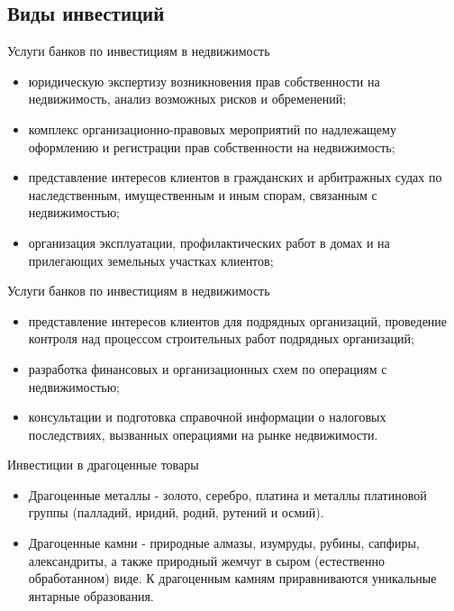 \documentclass[_Banking_p3.tex]{subfiles}
\begin{document}
\subsection{Виды инвестиций}
\begin{frame}{Услуги банков по инвестициям в недвижимость}
\begin{itemize}[<+->]
\item
юридическую экспертизу возникновения прав собственности на недвижимость, анализ возможных рисков и обременений;

\item
комплекс организационно-правовых мероприятий по надлежащему оформлению и регистрации прав собственности на недвижимость;

\item
представление интересов клиентов в гражданских и арбитражных судах по наследственным, имущественным и иным спорам, связанным с недвижимостью;

\item
организация эксплуатации, профилактических работ в домах и на прилегающих земельных участках клиентов;

\end{itemize}

\end{frame}

\begin{frame}{Услуги банков по инвестициям в недвижимость}
\begin{itemize}[<+->]
\item
представление интересов клиентов для подрядных организаций, проведение контроля над процессом строительных работ подрядных организаций;

\item
разработка финансовых и организационных схем по операциям с недвижимостью;

\item
консультации и подготовка справочной информации о налоговых последствиях, вызванных операциями на рынке недвижимости.

\end{itemize}

\end{frame}


\begin{frame}{Инвестиции в драгоценные товары}
\begin{itemize}[<+->]
\item
Драгоценные металлы - золото, серебро, платина и металлы платиновой группы (палладий, иридий, родий, рутений и осмий).

\item
Драгоценные камни - природные алмазы, изумруды, рубины, сапфиры, александриты, а также природный жемчуг в сыром (естественно обработанном) виде. К драгоценным камням приравниваются уникальные янтарные образования.

\end{itemize}

\end{frame}
\end{document}
